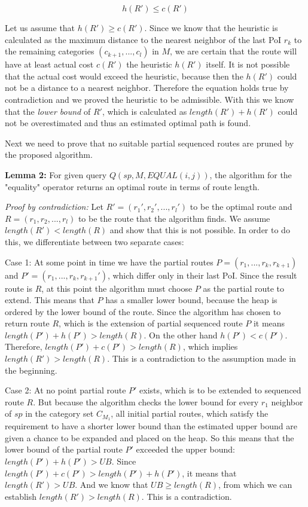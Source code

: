 \begin{equation}
h(R') \leq c(R')
\end{equation} 

Let us assume that $h(R') \geq c(R')$. Since we know that the heuristic is calculated as the maximum distance to the nearest neighbor of the last PoI $r_k$ to the remaining categories $(c_{k+1}, ..., c_l)$ in $M$, we are certain that the route will have at least actual cost $c(R')$ the heuristic $h(R')$ itself. It is not possible that the actual cost would exceed the heuristic, because then the $h(R')$ could not be a distance to a nearest neighbor. Therefore the equation holds true by contradiction and we proved the heuristic to be admissible. With this we know that the \textit{lower bound} of $R'$, which is calculated as $length(R') + h(R')$ could not be overestimated and thus an estimated optimal path is found.

Next we need to prove that no suitable partial sequenced routes are pruned by the proposed algorithm.

\textbf{Lemma 2:} For given query $Q(sp, M, EQUAL(i, j))$, the algorithm for the "equality" operator returns an optimal route in terms of route length.

\textit{Proof by contradiction:} Let $R' = (r_1', r_2', ..., r_l')$ to be the optimal route and $R = (r_1, r_2, ..., r_l)$ to be the route that the algorithm finds. We assume $length(R') < length(R)$ and show that this is not possible. In order to do this, we differentiate between two separate cases: 

Case 1: At some point in time we have the partial routes $P = (r_1, ..., r_k, r_{k+1})$ and $P' = (r_1, ..., r_k, r_{k+1}')$, which differ only in their last PoI. Since the result route is $R$, at this point the algorithm must choose $P$ as the partial route to extend. This means that $P$ has a smaller lower bound, because the heap is ordered by the lower bound of the route. Since the algorithm has chosen to return route $R$, which is the extension of partial sequenced route $P$ it means $length(P')+ h(P') > length(R)$. On the other hand $h(P') < c(P')$. Therefore, $length (P')+ c(P') > length(R)$, which implies $length(R') > length(R)$. This is a contradiction to the assumption made in the beginning.

Case 2: At no point partial route $P'$ exists, which is to be extended to sequenced route $R$. But because the algorithm checks the lower bound for every $r_1$ neighbor of $sp$ in the category set $C_{M_1}$, all initial partial routes, which satisfy the requirement to have a shorter lower bound than the estimated upper bound are given a chance to be expanded and placed on the heap. So this means that the lower bound of the partial route $P'$ exceeded the upper bound: $length(P') + h(P') > UB$. Since $length(P') + c(P') > length(P') + h(P')$, it means that $length(R') > UB$. And we know that $UB \geq length(R)$, from which we can establish $length(R') > length(R)$. This is a contradiction.

